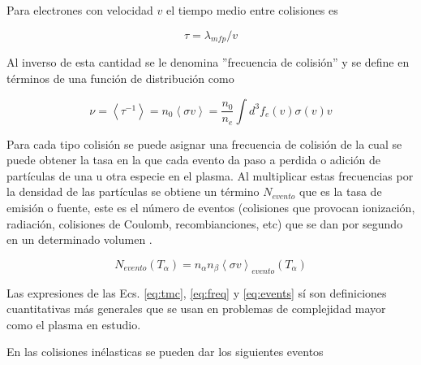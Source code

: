   Para electrones con velocidad $v$ el tiempo medio entre colisiones es

  \begin{equation}\label{eq:tmc}
    \tau = \lambda_{mfp}/v
  \end{equation}

  Al inverso de esta cantidad se le denomina ''frecuencia de colisi\'on'' y se define en t\'erminos de una funci\'on de distribuci\'on como
  
  \begin{equation}\label{eq:freq}
    \nu = \left<\tau^{-1}\right> = n_0\left<\sigma v\right> = \frac{n_0}{n_e}\int d^3 f_e(v)\sigma(v)v
  \end{equation}

  Para cada tipo colisi\'on se puede asignar una frecuencia de colisi\'on de la cual se puede obtener la tasa en la que cada evento da paso a perdida o adici\'on de part\'iculas de una u otra especie en el plasma. Al multiplicar estas frecuencias por la densidad de las part\'iculas se obtiene un t\'ermino $N_{evento}$ que es la tasa de emisi\'on o fuente, este es el n\'umero de eventos (colisiones que provocan ionizaci\'on, radiaci\'on, colisiones de Coulomb, recombianciones, etc) que se dan por segundo en un determinado volumen \cite{lechte2002}.

  \begin{equation}\label{eq:events}
    N_{evento}(T_\alpha) = n_\alpha n_\beta\left<\sigma v\right>_{evento}(T_\alpha) 
  \end{equation}

  Las expresiones de las Ecs. \eqref{eq:tmc}, \eqref{eq:freq} y \eqref{eq:events} s\'i son definiciones cuantitativas m\'as generales que se usan en problemas de complejidad mayor como el plasma en estudio.

  En las colisiones in\'elasticas se pueden dar los siguientes eventos

